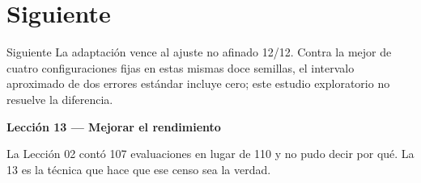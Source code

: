 \section{Siguiente}

\begin{frame}{Siguiente}
La adaptación vence al ajuste no afinado 12/12. Contra la mejor de cuatro configuraciones fijas en estas mismas doce semillas, el intervalo aproximado de dos errores estándar incluye cero; este estudio exploratorio no resuelve la diferencia.

\vspace{0.8em}
\textbf{Lección 13 --- Mejorar el rendimiento}

La Lección 02 contó 107 evaluaciones en lugar de 110 y no pudo decir por qué. La 13 es la técnica que hace que ese censo sea la verdad.
\end{frame}

